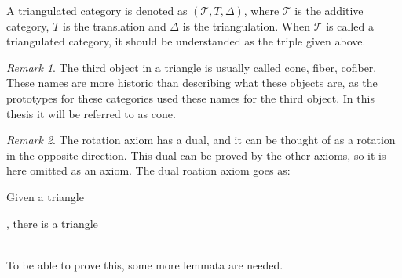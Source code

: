\documentclass[12pt]{article}
\theoremstyle{definition}
\theoremstyle{remark}
\newtheorem*{remark}{Remark}
\begin{document}
            A triangulated category is denoted as $(\mathcal{T}, T, \Delta)$, where $\mathcal{T}$ is the additive category, $T$ is the translation and $\Delta$ is the triangulation. When $\mathcal{T}$ is called a triangulated category, it should be understanded as the triple given above.
            \begin{remark}
                The third object in a triangle is usually called cone, fiber, cofiber. These names are more historic than describing what these objects are, as the prototypes for these categories used these names for the third object. In this thesis it will be referred to as cone.
            \end{remark}
            \begin{remark}
                The rotation axiom has a dual, and it can be thought of as a rotation in the opposite direction. This dual can be proved by the other axioms, so it is here omitted as an axiom. The dual roation axiom goes as:

                Given a triangle , there is a triangle  \\ %
                To be able to prove this, some more lemmata are needed.
            \end{remark}
\end{document}
